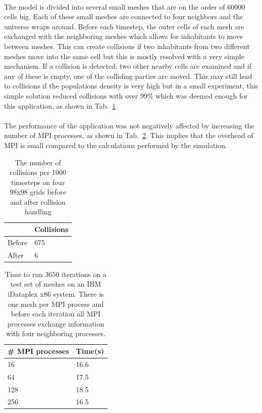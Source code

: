 \documentclass{article}
\begin{document}
\paragraph{}
The model is divided into several small meshes that are on the order of 60000 cells big. Each of these small meshes are connected to four neighbors and the universe wraps around. Before each timestep, the outer cells of each mesh are exchanged with the neighboring meshes which allows for inhabitants to move between meshes. This can create collisions if two inhabitants from two different meshes move into the same cell but this is mostly resolved with a very simple mechanism. If a collision is detected, two other nearby cells are examined and if any of these is empty, one of the colliding parties are moved. This may still lead to collisions if the populations density is very high but in a small experiment, this simple solution reduced collisions with over 99\% which was deemed enough for this application, as shown in Tab.~\ref{collisions}.

\paragraph{}
The performance of the application was not negatively affected by increasing the  number of MPI processes, as shown in Tab.~\ref{mpiperformance}. This implies that the overhead of MPI is small compared to the calculations performed by the simulation.

\begin{table}
\centering
\begin{tabular}{|l|l|}
\hline
& Collisions\\
\hline
Before & 675\\
\hline
After & 6\\
\hline
\end{tabular}
\caption{The number of collisions per 1000 timesteps on four 98x98 grids before and after collision handling}
\label{collisions}
\end{table}

\begin{table}
\centering
\begin{tabular}{|l|l|}
\hline
\# MPI processes& Time(s) \\
\hline
16 & 16.6\\
\hline
64 & 17.5\\
\hline
128 & 18.5\\
\hline
256 & 16.5\\
\hline
\end{tabular}
\caption{Time to run 3650 iterations on a test set of meshes on an IBM iDataplex x86 system. There is one mesh per MPI process and before each iteration all MPI processes exchange information with four neighboring processes.}
\label{mpiperformance}
\end{table}
\end{document}
